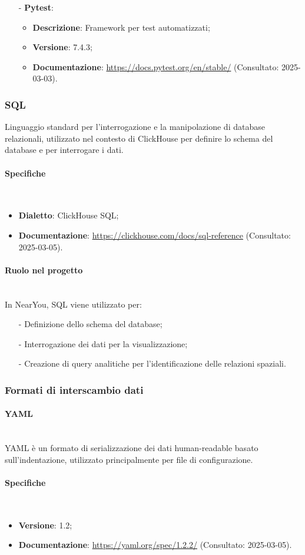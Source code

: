 \documentclass[10pt]{article}
\newcommand{\myparagraph}[1]{\paragraph{#1}\mbox{}\\}
\begin{document}
\begin{itemize}
    \item[-] \textbf{Pytest}:
    \begin{itemize}
        \item \textbf{Descrizione}: Framework per test automatizzati;
        \item \textbf{Versione}: 7.4.3;
        \item \textbf{Documentazione}: \textcolor{blue}{\url{https://docs.pytest.org/en/stable/}} (Consultato: 2025-03-03).
    \end{itemize}
\end{itemize}

\subsubsection{SQL}
Linguaggio standard per l'interrogazione e la manipolazione di database relazionali, utilizzato nel contesto di ClickHouse per definire lo schema del database e per interrogare i dati.

\myparagraph{Specifiche}
\begin{itemize}
    \item \textbf{Dialetto}: ClickHouse SQL;
    \item \textbf{Documentazione}: \textcolor{blue}{\url{https://clickhouse.com/docs/sql-reference}} (Consultato: 2025-03-05).
\end{itemize}

\myparagraph{Ruolo nel progetto}
In NearYou, SQL viene utilizzato per:
\begin{itemize}
    \item[-] Definizione dello schema del database;
    \item[-] Interrogazione dei dati per la visualizzazione;
    \item[-] Creazione di query analitiche per l'identificazione delle relazioni spaziali.
\end{itemize}

\subsubsection{Formati di interscambio dati}
\myparagraph{YAML}
YAML è un formato di serializzazione dei dati human-readable basato sull'indentazione, utilizzato principalmente per file di configurazione.

\myparagraph{Specifiche}
\begin{itemize}
    \item \textbf{Versione}: 1.2;
    \item \textbf{Documentazione}: \textcolor{blue}{\url{https://yaml.org/spec/1.2.2/}} (Consultato: 2025-03-05).
\end{itemize}
\end{document}
